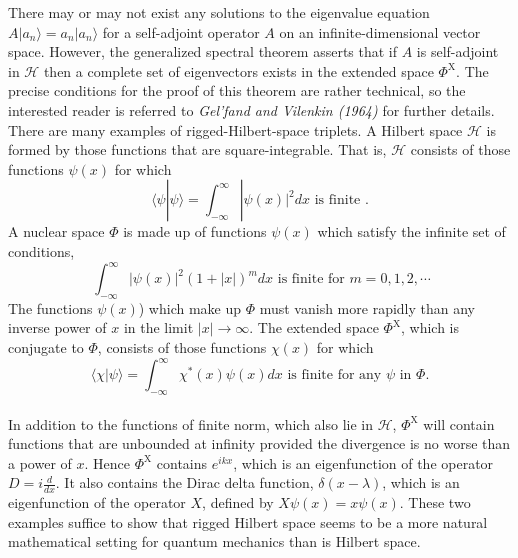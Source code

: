 \noindent
There may or may not exist any solutions to the eigenvalue equation $A|a_n\rangle = a_n |a_n\rangle$ for a self-adjoint operator $A$ on an infinite-dimensional vector space. However, the generalized spectral theorem asserts that if $A$ is self-adjoint in $\mathcal{H}$ then a complete set of eigenvectors exists in the extended space $\Phi^{\mathrm{X}}$. The precise conditions for the proof of this theorem are rather technical, so the interested reader is referred to \emph{Gel'fand and Vilenkin (1964)} for further details.
\\
There are many examples of rigged-Hilbert-space triplets. A Hilbert space $\mathcal{H}$ is formed by those functions that are square-integrable. That is, $\mathcal{H}$ consists of those functions $\psi(x)$ for which
\[\langle \psi | \psi \rangle = \int_{-\infty}^{\infty} |\psi(x)|^2 dx \mbox{ is finite }.\]
A nuclear space $\Phi$ is made up of functions $\psi(x)$ which satisfy the infinite set of conditions,
\[\ \int_{-\infty}^{\infty} |\psi(x)|^2(1+|x|)^m dx \mbox{ is finite for } m = 0,1,2,\cdots \]
The functions $\psi(x)$) which make up $\Phi$ must vanish more rapidly than any inverse power of $x$ in the limit $|x| \to \infty$. The extended space $\Phi^{\mathrm{X}}$, which is conjugate to $\Phi$, consists of those functions $\chi(x)$ for which
\[\langle \chi | \psi \rangle = \int_{-\infty}^{\infty} \chi^*(x)\psi(x) dx \mbox{ is finite for any } \psi \mbox{ in } \Phi.\]
\\
In addition to the functions of finite norm, which also lie in $\mathcal{H}$, $\Phi^{\mathrm{X}}$ will contain functions that are unbounded at infinity provided the divergence is no worse than a power of $x$. Hence $\Phi^{\mathrm{X}}$ contains $e^{ikx}$, which is an eigenfunction
of the operator $D = i \frac{d}{dx}$. It also contains the Dirac delta function, $\delta(x-\lambda)$, which is an eigenfunction of the operator $X$, defined by $X\psi(x) = x\psi(x)$.
These two examples suffice to show that rigged Hilbert space seems to be a more natural mathematical setting for quantum mechanics than is Hilbert space.

